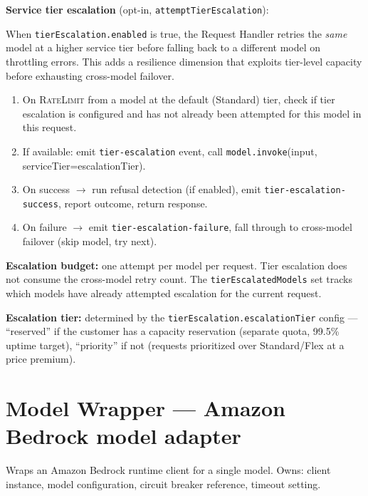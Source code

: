 \documentclass[10pt,letterpaper]{article}
\newcommand{\op}[1]{\textsc{#1}}
\newcommand{\fn}[1]{\texttt{#1}}
\newcommand{\fld}[1]{\texttt{#1}}
\begin{document}
\medskip
\noindent\textbf{Service tier escalation} (opt-in, \fn{attemptTierEscalation}):

When \fld{tierEscalation.enabled} is true, the Request Handler retries the \emph{same} model at a higher service tier before falling back to a different model on throttling errors. This adds a resilience dimension that exploits tier-level capacity before exhausting cross-model failover.

\begin{enumerate}[nosep]
  \item On \op{RateLimit} from a model at the default (Standard) tier, check if tier escalation is configured and has not already been attempted for this model in this request.
  \item If available: emit \texttt{tier-escalation} event, call \fn{model.invoke}(input, serviceTier=escalationTier).
  \item On success $\to$ run refusal detection (if enabled), emit \texttt{tier-escalation-success}, report outcome, return response.
  \item On failure $\to$ emit \texttt{tier-escalation-failure}, fall through to cross-model failover (skip model, try next).
\end{enumerate}

\noindent\textbf{Escalation budget:} one attempt per model per request. Tier escalation does not consume the cross-model retry count. The \fld{tierEscalatedModels} set tracks which models have already attempted escalation for the current request.

\noindent\textbf{Escalation tier:} determined by the \fld{tierEscalation.escalationTier} config --- ``reserved'' if the customer has a capacity reservation (separate quota, 99.5\% uptime target), ``priority'' if not (requests prioritized over Standard/Flex at a price premium).

\section*{{\color{modelgreen}Model Wrapper} \normalfont\small--- Amazon Bedrock model adapter}

Wraps an Amazon Bedrock runtime client for a single model. Owns: client instance, model configuration, circuit breaker reference, timeout setting.
\end{document}
